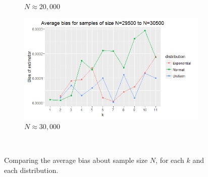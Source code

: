 \documentclass[12pt]{report}
\begin{document}
\begin{figure}
{\begin{subfigure}[b]{.6\textwidth}
\caption{$N \approx 20,000$}
\end{subfigure}%
\begin{subfigure}[b]{.6\textwidth}
\centering
\includegraphics[width=\textwidth]{./Graphs/Best/kVbiasapprox30000.png}
\caption{$N \approx 30,000$}
\end{subfigure}%
}\    
\caption{Comparing the average bias about sample size $N$, for each $k$ and each distribution.} \label{OptimalK_graphs}
\end{figure}
\end{document}
